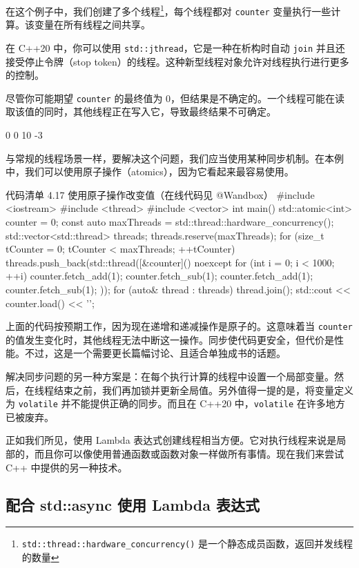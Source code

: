 在这个例子中，我们创建了多个线程\footnote{\texttt{std::thread::hardware\_concurrency()} 是一个静态成员函数，返回并发线程的数量}，每个线程都对 \texttt{counter} 变量执行一些计算。该变量在所有线程之间共享。


在 C++20 中，你可以使用 \texttt{std::jthread}，它是一种在析构时自动 \texttt{join} 并且还接受停止令牌（stop token）的线程。这种新型线程对象允许对线程执行进行更多的控制。

尽管你可能期望 \texttt{counter} 的最终值为 0，但结果是不确定的。一个线程可能在读取该值的同时，其他线程正在写入它，导致最终结果不可确定。

\begin{codebox}
0
0
10
-3
\end{codebox}

与常规的线程场景一样，要解决这个问题，我们应当使用某种同步机制。在本例中，我们可以使用原子操作（atomics），因为它看起来最容易使用。

\begin{codeboxt}{代码清单 4.17 使用原子操作改变值（在线代码见 @Wandbox）}
#include <iostream>
#include <thread>
#include <vector>
int main() {
std::atomic<int> counter = 0;
const auto maxThreads = std::thread::hardware_concurrency();
std::vector<std::thread> threads;
threads.reserve(maxThreads);
for (size_t tCounter = 0; tCounter < maxThreads; ++tCounter) {
threads.push_back(std::thread([&counter]() noexcept {
for (int i = 0; i < 1000; ++i) {
counter.fetch_add(1);
counter.fetch_sub(1);
counter.fetch_add(1);
counter.fetch_sub(1);
}
}));
}
for (auto& thread : threads)
thread.join();
std::cout << counter.load() << '\n';
}
\end{codeboxt}

上面的代码按预期工作，因为现在递增和递减操作是原子的。这意味着当 \texttt{counter} 的值发生变化时，其他线程无法中断这一操作。同步使代码更安全，但代价是性能。不过，这是一个需要更长篇幅讨论、且适合单独成书的话题。


解决同步问题的另一种方案是：在每个执行计算的线程中设置一个局部变量。然后，在线程结束之前，我们再加锁并更新全局值。另外值得一提的是，将变量定义为 \texttt{volatile} 并不能提供正确的同步。而且在 C++20 中，\texttt{volatile} 在许多地方已被废弃。

正如我们所见，使用 Lambda 表达式创建线程相当方便。它对执行线程来说是局部的，而且你可以像使用普通函数或函数对象一样做所有事情。现在我们来尝试 C++ 中提供的另一种技术。

\subsection{配合 std::async 使用 Lambda 表达式}

